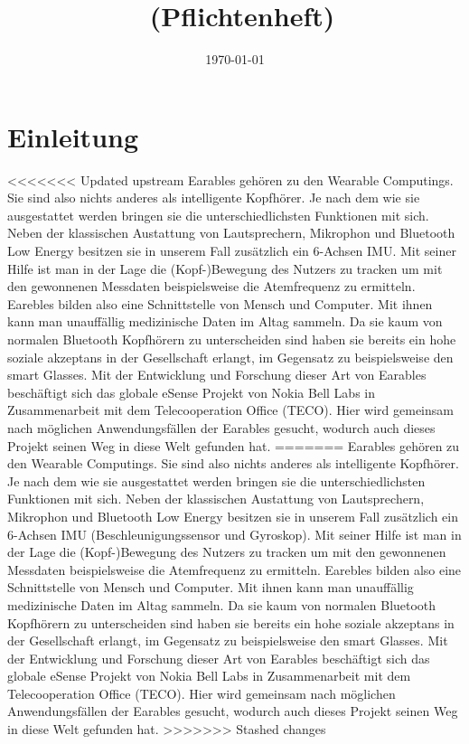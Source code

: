 \documentclass[a4paper,12pt]{article}
\title{\projektName~(Pflichtenheft)}
\author{\authorName}
\date{\today}
\begin{document}
 \setcounter{page}{2}
 \tableofcontents          %
 \clearpage

\section{Einleitung}
<<<<<<< Updated upstream
Earables gehören zu den Wearable Computings. Sie sind also nichts anderes als intelligente Kopfhörer. Je nach dem wie sie ausgestattet werden bringen sie die unterschiedlichsten Funktionen mit sich. Neben der klassischen Austattung von  Lautsprechern, Mikrophon und Bluetooth Low Energy besitzen sie in unserem Fall zusätzlich ein 6-Achsen IMU. Mit seiner Hilfe ist man in der Lage die (Kopf-)Bewegung des Nutzers zu tracken um mit den gewonnenen Messdaten  beispielsweise die Atemfrequenz zu ermitteln. Earebles bilden also eine Schnittstelle von Mensch und Computer. Mit ihnen kann man unauffällig medizinische Daten im Altag sammeln. Da sie kaum von normalen Bluetooth Kopfhörern zu unterscheiden sind haben sie bereits ein hohe soziale akzeptans in der Gesellschaft erlangt, im Gegensatz zu beispielsweise den smart Glasses. Mit der Entwicklung und Forschung dieser Art von Earables beschäftigt sich das globale eSense Projekt von Nokia Bell Labs in Zusammenarbeit mit dem Telecooperation Office (TECO). Hier wird gemeinsam nach möglichen Anwendungsfällen der Earables gesucht, wodurch auch dieses Projekt seinen Weg in diese Welt gefunden hat.
=======
Earables gehören zu den Wearable Computings. Sie sind also nichts anderes als intelligente Kopfhörer. Je nach dem wie sie ausgestattet werden bringen sie die unterschiedlichsten Funktionen mit sich. Neben der klassischen Austattung von  Lautsprechern, Mikrophon und Bluetooth Low Energy besitzen sie in unserem Fall zusätzlich ein 6-Achsen IMU (Beschleunigungssensor und Gyroskop). Mit seiner Hilfe ist man in der Lage die (Kopf-)Bewegung des Nutzers zu tracken um mit den gewonnenen Messdaten  beispielsweise die Atemfrequenz zu ermitteln. Earebles bilden also eine Schnittstelle von Mensch und Computer. Mit ihnen kann man unauffällig medizinische Daten im Altag sammeln. Da sie kaum von normalen Bluetooth Kopfhörern zu unterscheiden sind haben sie bereits ein hohe soziale akzeptans in der Gesellschaft erlangt, im Gegensatz zu beispielsweise den smart Glasses. Mit der Entwicklung und Forschung dieser Art von Earables beschäftigt sich das globale eSense Projekt von Nokia Bell Labs in Zusammenarbeit mit dem Telecooperation Office (TECO). Hier wird gemeinsam nach möglichen Anwendungsfällen der Earables gesucht, wodurch auch dieses Projekt seinen Weg in diese Welt gefunden hat.
>>>>>>> Stashed changes
\end{document}
